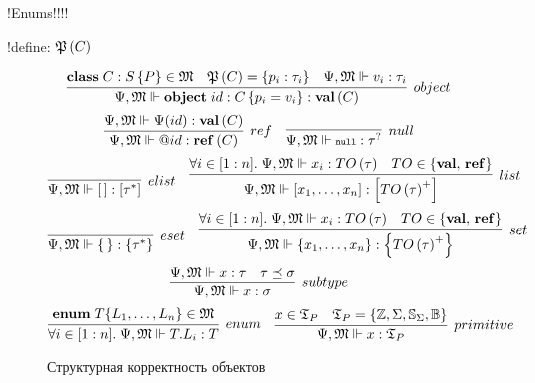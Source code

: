 !Enums!!!!

!define: $\mathfrak{P}\left(C\right)$

\begin{figure}[htbp]
	\centering
$$
	\infer[object]{
		\fromMM \Object{id}{C}{p_i = v_i} : \ClassT{C}
	}{
		\Class{C}{S}{P} \in \MM{M}&
		\AllProps{C} = \{p_i : \tau_i\}&
		\fromMM v_i : \tau_i
	}
$$
$$
\infer[ref]{
	\fromMM \Ref{id} : \RefT{C}
}{
	\fromMM \RContext(id) : \ClassT{C}
}
\quad
\infer[null]{
	\fromMM \Null : \NullableT{\tau}
}{}
$$
$$
\infer[elist]{
	\fromMM \List{\,} : \ListT{\tau^*}
}{}
\quad
\infer[list]{
	\fromMM \List{x_1, \ldots, x_n} : \List{\type{TO}{\tau}^+}
}{
	\forall i\in[1:n]. \; \fromMM x_i : \type{TO}{\tau} &
	TO \in \{\valts,\, \refts\}
}
$$
$$
\infer[eset]{
	\fromMM \Set{\,} : \SetT{\tau^*}
}{}
\quad
\infer[set]{
	\fromMM \Set{x_1, \ldots, x_n} : \SetT{\type{TO}{\tau}^+}
}{
	\forall i\in[1:n]. \; \fromMM x_i : \type{TO}{\tau} &
	TO \in \{\valts,\, \refts\}
}
$$
$$
\infer[subtype]{
	\fromMM x : \sigma
}{
	\fromMM x : \tau &
	\tau \subtype \sigma
}
$$
$$
\infer[enum]{
	\forall i \in [1:n]. \; \fromMM T.L_i : T
}{
	\mathbf{enum}\;T\{L_1,\ldots,L_n\} \in \MM{M}
}
\quad
\infer[primitive]{
	\fromMM x : \Types_P
}{
	x \in \Types_P & 
	\Types_P = \{\IntegerT, \CharT, \StringT, \BooleanT\}
}
$$
	\caption{Структурная корректность объектов}\label{TypesMM}
\end{figure}


